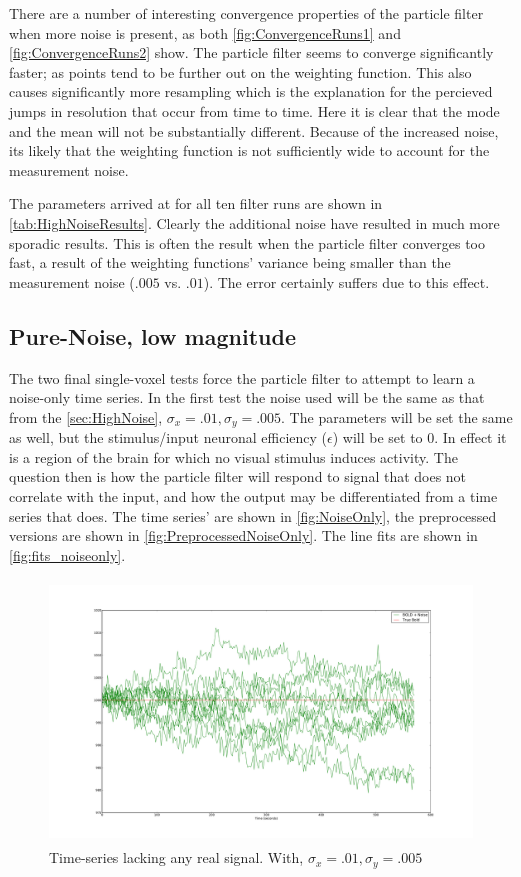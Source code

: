 There are a number of interesting convergence properties of the
particle filter when more noise is present, as both \autoref{fig:ConvergenceRuns1} and
\autoref{fig:ConvergenceRuns2} show. The particle filter seems to converge
significantly faster; as points tend to be further out on the weighting function. This
also causes significantly more resampling which is the explanation for the percieved
jumps in resolution that occur from time to time. Here it is clear that the mode and
the mean will not be substantially different. Because of the increased noise, its likely
that the weighting function is not sufficiently wide to account for the measurement noise.

The parameters arrived at for all ten filter runs are shown in \autoref{tab:HighNoiseResults}.
Clearly the additional noise have resulted in much more sporadic results. This is often the 
result when the particle filter converges too fast, a result of the weighting functions' variance
being smaller than the measurement noise ($.005$ vs. $.01$). The error
certainly suffers due to this effect.

\subsection{Pure-Noise, low magnitude}
\label{sec:PureNoiseLowMag}
The two final single-voxel tests force the particle filter to attempt to learn a noise-only
time series. In the first test the noise used will be the same as that from the \autoref{sec:HighNoise},
$\sigma_x = .01, \sigma_y = .005$. The parameters will be set the same as well, but the
stimulus/input neuronal efficiency ($\epsilon$) will be set to 0. In effect it is a region of the brain for
which no visual stimulus induces activity. The question then is how the
particle filter will respond to signal that does not correlate with the input, and how
the output may be differentiated from a time series that does. The time series'
are shown in \autoref{fig:NoiseOnly}, the preprocessed versions are shown in \autoref{fig:PreprocessedNoiseOnly}.
The line fits are shown in \autoref{fig:fits_noiseonly}. 

\begin{figure}[H]
\centering
\includegraphics[clip=true,trim=6cm 3cm 6cm 3cm,height=7cm]{images/realization_noiseonly}
\caption{Time-series lacking any real signal. With, $\sigma_x = .01, \sigma_y=.005$}
\label{fig:NoiseOnly}
\end{figure}

